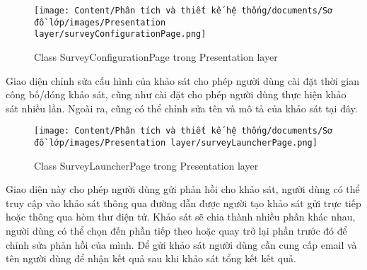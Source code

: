 \begin{figure}[H]
    \centering
    \texttt{[image: Content/Phân tích và thiết kế hệ thống/documents/Sơ đồ lớp/images/Presentation layer/surveyConfigurationPage.png]}
    \vspace{0.5cm}
    \caption{Class SurveyConfigurationPage trong Presentation layer}
    \label{fig:Class SurveyConfigurationPage trong Presentation layer}
\end{figure}
Giao diện chỉnh sửa cấu hình của khảo sát cho phép người dùng cài đặt thời gian công bố/đóng khảo sát, cũng như cài đặt cho phép người dùng thực hiện khảo sát nhiều lần. Ngoài ra, cũng có thể chỉnh sửa tên và mô tả của khảo sát tại đây.

\begin{figure}[H]
    \centering
    \texttt{[image: Content/Phân tích và thiết kế hệ thống/documents/Sơ đồ lớp/images/Presentation layer/surveyLauncherPage.png]}
    \vspace{0.5cm}
    \caption{Class SurveyLauncherPage trong Presentation layer}
    \label{fig:Class SurveyLauncherPage trong Presentation layer}
\end{figure}
Giao diện này cho phép người dùng gửi phản hồi cho khảo sát, người dùng có thể truy cập vào khảo sát thông qua đường dẫn được người tạo khảo sát gửi trực tiếp hoặc thông qua hòm thư điện tử. Khảo sát sẽ chia thành nhiều phần khác nhau, người dùng có thể chọn đến phần tiếp theo hoặc quay trở lại phần trước đó để chỉnh sửa phản hồi của mình. Để gửi khảo sát người dùng cần cung cấp email và tên người dùng để nhận kết quả sau khi khảo sát tổng kết kết quả.